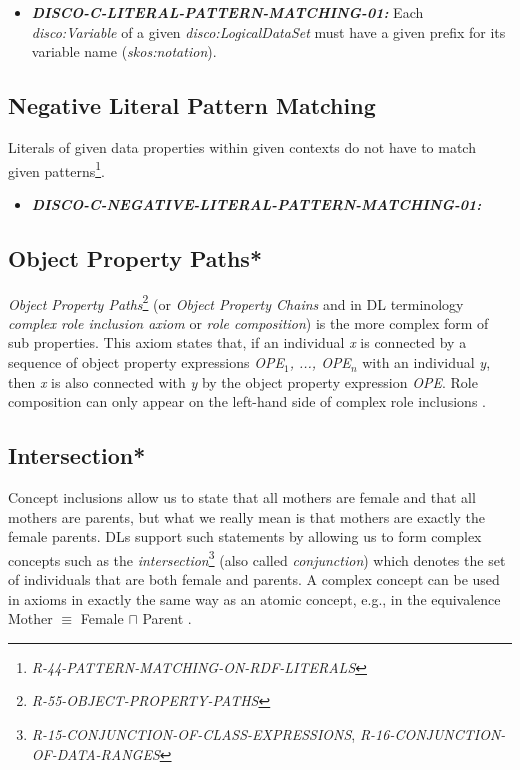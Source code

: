 \documentclass{llncs}
\begin{document}
\begin{itemize}
	\item \textbf{{\em DISCO-C-LITERAL-PATTERN-MATCHING-01:}} Each \emph{disco:Variable} of a given \emph{disco:LogicalDataSet} must have a given prefix for its variable name (\emph{skos:notation}). 
\end{itemize}

\subsection{Negative Literal Pattern Matching}

Literals of given data properties within given contexts do not have to match given patterns\footnote{\emph{R-44-PATTERN-MATCHING-ON-RDF-LITERALS}}. 

\begin{itemize}
	\item \textbf{{\em DISCO-C-NEGATIVE-LITERAL-PATTERN-MATCHING-01:}} 
\end{itemize}

\subsection{Object Property Paths*}

\emph{Object Property Paths}\footnote{\emph{R-55-OBJECT-PROPERTY-PATHS}} (or \emph{Object Property Chains} and in DL terminology \emph{complex role inclusion axiom} or \emph{role composition}) is the more complex form of sub properties. 
This axiom states that, if an individual \emph{x} is connected by a sequence of object property expressions \emph{OPE$_1$, ..., OPE$_n$} with an individual \emph{y}, then \emph{x} is also connected with \emph{y} by the object property expression \emph{OPE}.  
Role composition can only appear on the left-hand side of complex role inclusions \cite{Kroetzsch2012}.

\subsection{Intersection*}

Concept inclusions allow us to state that all mothers are female and that
all mothers are parents, but what we really mean is that mothers are exactly the female
parents. DLs support such statements by allowing us to form complex concepts such as
the \emph{intersection}\footnote{\emph{R-15-CONJUNCTION-OF-CLASS-EXPRESSIONS}, \emph{R-16-CONJUNCTION-OF-DATA-RANGES}} (also called \emph{conjunction})
which denotes the set of individuals that are both female and parents. A complex concept
can be used in axioms in exactly the same way as an atomic concept, e.g., in the
equivalence Mother $\equiv$ Female $\sqcap$ Parent .
\end{document}

